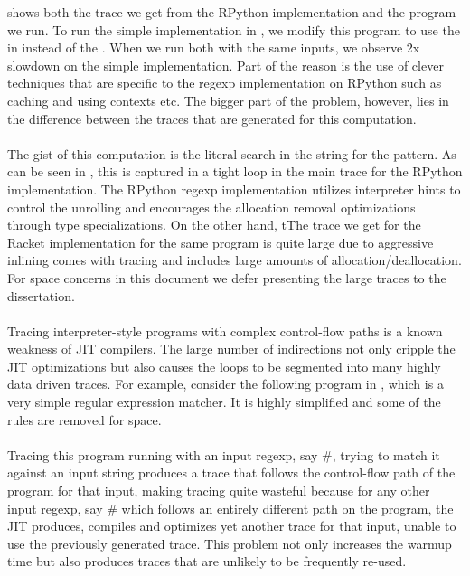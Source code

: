 			 shows both the trace we get
			from the RPython implementation and the program we run. To run the
			simple implementation in , we modify this program
			to use the  in instead of the
			. When we run both with the same inputs, we
			observe 2x slowdown on the simple implementation. Part of the reason
			is the use of clever techniques that are specific to the regexp
			implementation on RPython such as caching and using contexts etc. The
			bigger part of the problem, however, lies in the difference between
			the traces that are generated for this computation.

			\paragraph{}%
			The gist of this computation is the literal search in the string for
			the  pattern. As can be seen in
			, this is captured in a tight loop in the
			main trace for the RPython implementation. The RPython regexp
			implementation utilizes interpreter hints to control the unrolling and
			encourages the allocation removal optimizations through type
			specializations. On the other hand, tThe trace we get for the Racket
			implementation for the same program is quite large due to aggressive
			inlining comes with tracing and includes large amounts of
			allocation/deallocation. For space concerns in this document we defer
			presenting the large traces to the dissertation.

			\paragraph{}%
			Tracing interpreter-style programs with complex control-flow paths is
			a known weakness of JIT compilers. The large number of indirections
			not only cripple the JIT optimizations but also causes the loops to be
			segmented into many highly data driven traces. For
			example, consider the following program in , which
			is a very simple regular expression matcher. It is highly simplified
			and some of the rules are removed for space.

			\paragraph{}%
			Tracing this program running with an input regexp, say
			$\mathtt{\#}$, trying to match it against an
			input string produces a trace that follows the control-flow path of
			the program for that input, making tracing quite wasteful because for
			any other input regexp, say $\mathtt{\#}$ which
			follows an entirely different path on the program, the JIT produces,
			compiles and optimizes yet another trace for that input, unable to use
			the previously generated trace. This problem not only increases the
			warmup time but also produces traces that are unlikely to be
			frequently re-used.

